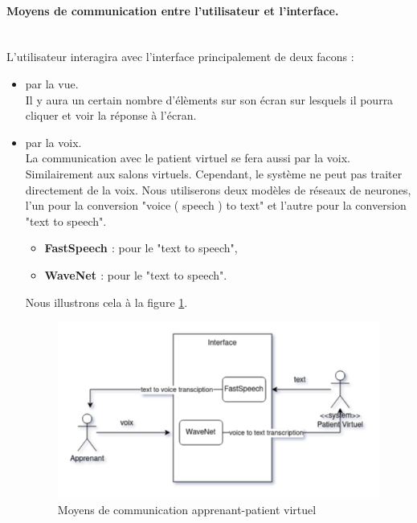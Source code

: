     \paragraph{Moyens de communication entre l'utilisateur et l'interface.} \hfill \\
    L'utilisateur interagira avec l'interface principalement de deux facons :
    \begin{itemize}
        \item par la vue. \\ Il y aura un certain nombre d'élèments sur son écran sur lesquels il pourra cliquer et voir la réponse à l'écran.
        \item par la voix. \\ La communication avec le patient virtuel se fera aussi par la voix. Similairement aux salons virtuels. Cependant, le système ne peut pas traiter directement de la voix. Nous utiliserons deux modèles de réseaux de neurones, l'un pour la conversion "voice ( speech ) to text" et l'autre pour la conversion "text to speech".
        \begin{itemize}
            \item \textbf{FastSpeech \cite{ren2019fastspeech}} : pour le "text to speech",
            \item \textbf{WaveNet \cite{oord2016wavenet}} : pour le "text to speech".
        \end{itemize}
        Nous illustrons cela à la figure \ref{fig:apprenant_patient_virtuel}.
        \begin{figure}[H]
            \centering
            \hspace*{-0.3in}
            \includegraphics[width=1.1\textwidth]{figures/context-moyens de communication.png}
            \captionsetup{justification=centering}
            \caption{Moyens de communication apprenant-patient virtuel}
            \label{fig:apprenant_patient_virtuel}
        \end{figure}
    \end{itemize}
    

